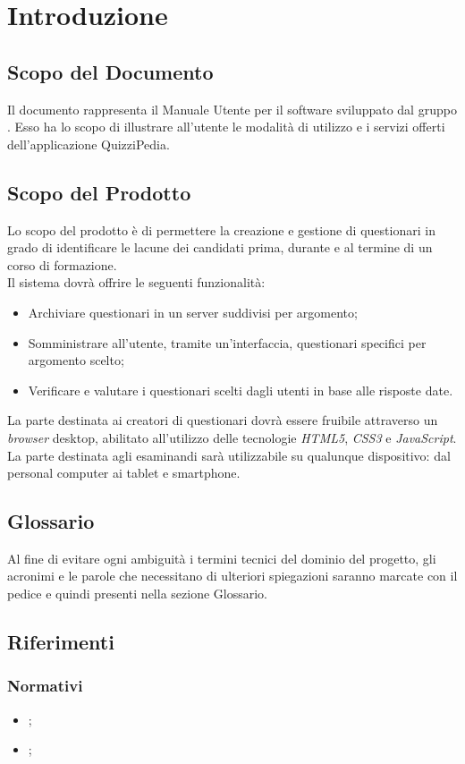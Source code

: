 \newpage
\section{Introduzione}
\subsection{Scopo del Documento}
Il documento rappresenta il Manuale Utente per il software \progetto{} sviluppato dal gruppo \gruppo. Esso ha lo scopo di illustrare all'utente le modalità di utilizzo e i servizi offerti dell'applicazione QuizziPedia.
\subsection{Scopo del Prodotto}
Lo scopo del prodotto è di permettere la creazione e gestione di questionari in grado di identificare le lacune dei candidati prima, durante e al termine di un corso di formazione. 
\\Il sistema dovrà offrire le seguenti funzionalità:
\begin{itemize}
	\item
	Archiviare questionari in un server suddivisi per argomento;
	\item
	Somministrare all'utente, tramite un'interfaccia, questionari specifici per argomento scelto;
	\item
	Verificare e valutare i questionari scelti dagli utenti in base alle risposte date.
\end{itemize}
La parte destinata ai creatori di questionari dovrà essere fruibile attraverso un \textit{browser} desktop, abilitato all'utilizzo delle tecnologie \textit{HTML5}, \textit{CSS3} e \textit{JavaScript}. La parte destinata agli esaminandi sarà utilizzabile su qualunque dispositivo: dal personal computer ai tablet e smartphone.
\subsection{Glossario}
Al fine di evitare ogni ambiguità i termini tecnici del dominio del progetto, gli acronimi e le parole che necessitano di ulteriori spiegazioni saranno marcate con il pedice  e quindi presenti nella sezione Glossario.
\subsection{Riferimenti}
\subsubsection{Normativi}
\begin{itemize}
	\item \textit{\NdPv};
	\item \textit{\AdRvDue};
\end{itemize}